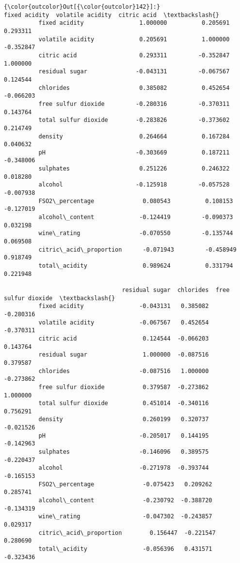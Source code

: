 \documentclass[11pt]{article}
\begin{document}
\begin{Verbatim}[commandchars=\\\{\}]
{\color{outcolor}Out[{\color{outcolor}142}]:}                         fixed acidity  volatile acidity  citric acid  \textbackslash{}
          fixed acidity                1.000000          0.205691     0.293311   
          volatile acidity             0.205691          1.000000    -0.352847   
          citric acid                  0.293311         -0.352847     1.000000   
          residual sugar              -0.043131         -0.067567     0.124544   
          chlorides                    0.385082          0.452654    -0.066203   
          free sulfur dioxide         -0.280316         -0.370311     0.143764   
          total sulfur dioxide        -0.283826         -0.373602     0.214749   
          density                      0.264664          0.167284     0.040632   
          pH                          -0.303669          0.187211    -0.348006   
          sulphates                    0.251226          0.246322     0.018280   
          alcohol                     -0.125918         -0.057528    -0.007938   
          FSO2\_percentage              0.080543          0.108153    -0.127019   
          alcohol\_content             -0.124419         -0.090373     0.032198   
          wine\_rating                 -0.070550         -0.135744     0.069508   
          citric\_acid\_proportion      -0.071943         -0.458949     0.918749   
          total\_acidity                0.989624          0.331794     0.221948   
          
                                  residual sugar  chlorides  free sulfur dioxide  \textbackslash{}
          fixed acidity                -0.043131   0.385082            -0.280316   
          volatile acidity             -0.067567   0.452654            -0.370311   
          citric acid                   0.124544  -0.066203             0.143764   
          residual sugar                1.000000  -0.087516             0.379587   
          chlorides                    -0.087516   1.000000            -0.273862   
          free sulfur dioxide           0.379587  -0.273862             1.000000   
          total sulfur dioxide          0.451014  -0.340116             0.756291   
          density                       0.260199   0.320737            -0.021526   
          pH                           -0.205017   0.144195            -0.142963   
          sulphates                    -0.146096   0.389575            -0.220437   
          alcohol                      -0.271978  -0.393744            -0.165153   
          FSO2\_percentage              -0.075423   0.209262             0.285741   
          alcohol\_content              -0.230792  -0.388720            -0.134319   
          wine\_rating                  -0.047302  -0.243857             0.029317   
          citric\_acid\_proportion        0.156447  -0.221547             0.280690   
          total\_acidity                -0.056396   0.431571            -0.323436   
          

\end{Verbatim}
\end{document}
